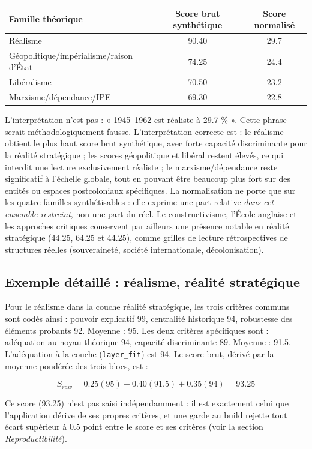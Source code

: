 \documentclass[11pt,a4paper]{article}
\begin{document}
\begin{center}
\begin{tabular}{p{5cm}cc}
\hline
Famille théorique & Score brut synthétique & Score normalisé \\
\hline
Réalisme & 90.40 & 29.7 \\
Géopolitique/impérialisme/raison d'État & 74.25 & 24.4 \\
Libéralisme & 70.50 & 23.2 \\
Marxisme/dépendance/IPE & 69.30 & 22.8 \\
\hline
\end{tabular}
\end{center}

L'interprétation n'est pas : « 1945--1962 est réaliste à 29.7 \% ». Cette phrase serait méthodologiquement fausse. L'interprétation correcte est : le réalisme obtient le plus haut score brut synthétique, avec forte capacité discriminante pour la réalité stratégique ; les scores géopolitique et libéral restent élevés, ce qui interdit une lecture exclusivement réaliste ; le marxisme/dépendance reste significatif à l'échelle globale, tout en pouvant être beaucoup plus fort sur des entités ou espaces postcoloniaux spécifiques. La normalisation ne porte que sur les quatre familles synthétisables : elle exprime une part relative \emph{dans cet ensemble restreint}, non une part du réel. Le constructivisme, l'École anglaise et les approches critiques conservent par ailleurs une présence notable en réalité stratégique (44.25, 64.25 et 44.25), comme grilles de lecture rétrospectives de structures réelles (souveraineté, société internationale, décolonisation).

\subsection{Exemple détaillé : réalisme, réalité stratégique}

Pour le réalisme dans la couche réalité stratégique, les trois critères communs sont codés ainsi : pouvoir explicatif 99, centralité historique 94, robustesse des éléments probants 92. Moyenne : 95. Les deux critères spécifiques sont : adéquation au noyau théorique 94, capacité discriminante 89. Moyenne : 91.5. L'adéquation à la couche (\texttt{layer\_fit}) est 94. Le score brut, dérivé par la moyenne pondérée des trois blocs, est :

\[
S_{raw}=0.25(95)+0.40(91.5)+0.35(94)=93.25
\]

Ce score (93.25) n'est pas saisi indépendamment : il est exactement celui que l'application dérive de ses propres critères, et une garde au build rejette tout écart supérieur à 0.5 point entre le score et ses critères (voir la section \emph{Reproductibilité}).
\end{document}
